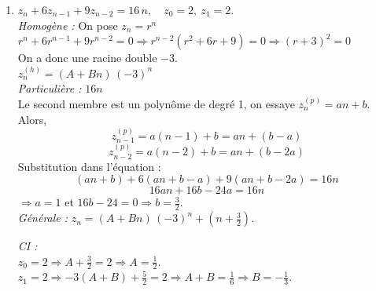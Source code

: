 \begin{solution}
\begin{enumerate}
\textit{Homogène :} $r^2-4r+4=(r-2)^2=0$. \\
On a donc une racine double, $r = 2$. \\
Cela donne comme solution homogène $\displaystyle y_n^{(h)}=(A+Bn)\,2^n.$ \\

\textit{Particulière :} Le second membre est constant $1$, on essaye $y_n^{(p)}=K$. \\
On remplace dans l'équation de récurrence : $K-4K+4K=K=1 \Rightarrow K=1$. Il n'y a pas de résonance car $1$ n'est pas solution de l'équation homogène). \\

\textit{Générale :} $\displaystyle y_n=(A+Bn)\,2^n+1.$

\textit{CI :} \\
$y_0=0 \Rightarrow A+1=0 \Rightarrow A=-1.$ \\ 
$y_1=3 \Rightarrow 2(A+B)+1=3 \Rightarrow A+B=1 \Rightarrow B=2.$

\[
\boxed{\,y_n=(2n-1)\,2^n+1\,}
\] \\

\item $\displaystyle z_n+6z_{n-1}+9z_{n-2}=16\,n,\quad z_0=2,\ z_1=2.$ \\

\textit{Homogène :} On pose $z_n = r^n$ \\
$r^n + 6r^{n-1} + 9r^{n-2} = 0 \Rightarrow r^{n-2} (r^2 + 6r + 9) = 0 \Rightarrow (r+3)^2 = 0$ \\
On a donc une racine double $-3$. \\
$\displaystyle z_n^{(h)}=(A+Bn)\,(-3)^n$ \\

\textit{Particulière :} $16n$ \\
Le second membre est un polynôme de degré 1, on essaye $z_n^{(p)}=an+b$. \\
Alors,
\[
z_{n-1}^{(p)} = a(n-1) + b = an + (b-a)
\]
\[
z_{n-2}^{(p)} = a(n-2) + b = an + (b-2a) 
\]
Substitution dans l'équation :
\[
(an + b) + 6 (an + b - a) + 9 (an + b - 2a) = 16n
\]
\[
16 an + 16 b - 24 a = 16n
\]
$\Rightarrow a=1$ et $16b-24=0 \Rightarrow b=\tfrac{3}{2}$. \\

\textit{Générale :} $\displaystyle z_n=(A+Bn)\,(-3)^n + (n+\tfrac{3}{2}).$

\textit{CI :} \\
$z_0=2 \Rightarrow A+\tfrac{3}{2}=2 \Rightarrow A=\tfrac{1}{2}.$  \\
$z_1=2 \Rightarrow -3(A+B)+\tfrac{5}{2}=2 \Rightarrow A+B=\tfrac{1}{6} \Rightarrow B=-\tfrac{1}{3}.$


\end{enumerate}
\end{solution}
